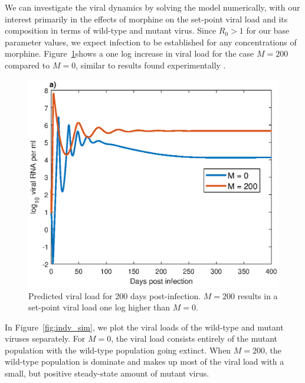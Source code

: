 \documentclass[11pt, oneside]{article}    %
\begin{document}
We can investigate the viral dynamics by solving the model numerically, with our interest primarily in the effects of morphine on the set-point viral load and its composition in terms of wild-type and mutant virus. Since $R_0 > 1$ for our base parameter values, we expect infection to be established for any concentrations of morphine. Figure~\ref{fig:base_sim}shows a one log increase in viral load for the case $M=200$ compared to $M=0$, similar to results found experimentally \cite{Kumar}.

\vspace{5mm}

\begin{figure}[h]
\begin{center}
\includegraphics[scale=0.75]{base_sim.eps}
\caption{Predicted viral load for 200 days post-infection. $M=200$ results in a set-point viral load one log higher than $M=0$.}
\label{fig:base_sim}
\end{center}
\end{figure}

In Figure~\ref{fig:indv_sim}, we plot the viral loads of the wild-type and mutant viruses separately. For $M=0$, the viral load consists entirely of the mutant population with the wild-type population going extinct. When $M=200$, the wild-type population is dominate and makes up most of the viral load with a small, but positive steady-state amount of mutant virus. 

\vspace{5mm}
\end{document}
